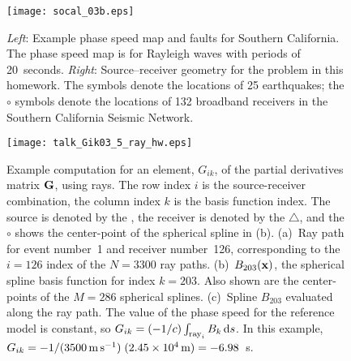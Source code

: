 \documentclass[11pt,titlepage,fleqn]{article}
\begin{document}
\begin{figure}[h]
\centering
\texttt{[image: socal\_03b.eps]}
\caption[Source--receiver geometry for southern California]
{{
{\em Left}: Example phase speed map and faults for Southern California. The phase speed map is for Rayleigh waves with periods of 20~seconds.
{\em Right}: Source--receiver geometry for the problem in this homework. The  symbols denote the locations of 25 earthquakes; the $\circ$ symbols denote the locations of 132 broadband receivers in the Southern California Seismic Network.
\label{fig:geometry}
}}
\end{figure}

\begin{figure}[p]
\hspace{-1.5cm}
\texttt{[image: talk\_Gik03\_5\_ray\_hw.eps]}
\caption[Basis function]
{{
Example computation for an element, $G_{ik}$, of the partial derivatives matrix $\mbox{${\bf G}$}$, using rays. The row index $i$ is the source-receiver combination, the column index $k$ is the basis function index. The source is denoted by the , the receiver is denoted by the $\triangle$, and the $\circ$ shows the center-point of the spherical spline in (b).
(a)~Ray path for event number~1 and receiver number~126, corresponding to the $i=126$ index of the $N=3300$ ray paths.
(b)~$B_{203}(\mbox{${\bf x}$})$, the spherical spline basis function for index $k=203$. Also shown are the center-points of the $M=286$ spherical splines.
(c)~Spline $B_{203}$ evaluated along the ray path. The value of the phase speed for the reference model is constant, so $G_{ik} = (-1/c) \int_{{\rm ray}_i} B_k\,\mathrm{d} s$. In this example, $G_{ik} = -1/(3500\,{\rm m\,s^{-1}})\;(2.45 \times 10^4\,{\rm m})  = -6.98$~s. 
\label{fig:basis}
}}
\end{figure}

\end{document}
